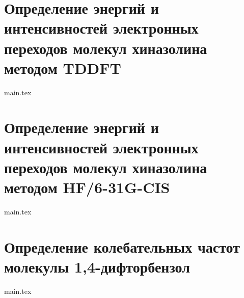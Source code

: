 \documentclass[12pt,a4paper]{article}
\begin{document}
\newpage
\section{Определение энергий и интенсивностей электронных переходов молекул хиназолина методом TDDFT}
{main.tex}

\newpage
\section{Определение энергий и интенсивностей электронных переходов молекул хиназолина методом HF/6-31G-CIS}
{main.tex}

\newpage
\section{Определение колебательных частот молекулы 1,4-дифторбензол}
{main.tex}


\end{document}

